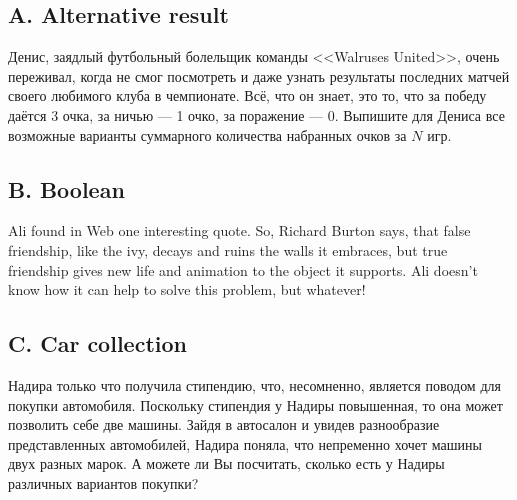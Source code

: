 \subsection*{A. Alternative result}

Денис, заядлый футбольный болельщик команды <<Walruses United>>, очень переживал, когда не смог посмотреть и даже узнать результаты последних матчей своего любимого клуба в чемпионате. Всё, что он знает, это то, что за победу даётся 3 очка, за ничью --- 1 очко, за поражение --- 0. Выпишите для Дениса все возможные варианты суммарного количества набранных очков за $N$ игр.







\subsection*{B. Boolean}

Ali found in Web one interesting quote. So, Richard Burton says, that false friendship, like the ivy, decays and ruins the walls it embraces, but true friendship gives new life and animation to the object it supports. Ali doesn’t know how it can help to solve this problem, but whatever!





\subsection*{C. Car collection}

Надира только что получила стипендию, что, несомненно, является поводом для покупки автомобиля. Поскольку стипендия у Надиры повышенная, то она может позволить себе две машины. Зайдя в автосалон и увидев разнообразие представленных автомобилей, Надира поняла, что непременно хочет машины двух разных марок. А можете ли Вы посчитать, сколько есть у Надиры различных вариантов покупки?


